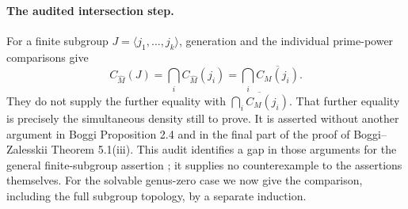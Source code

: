 \paragraph{The audited intersection step.}
For a finite subgroup $J=\langle j_1,\ldots,j_k\rangle$,
generation and the individual prime-power comparisons give
\[
 C_{\widehat M}(J)
   =\bigcap_i C_{\widehat M}(j_i)
   =\bigcap_i\overline{C_M(j_i)}.
                                                               \tag{A.T2}
\]
They do not supply the further equality with
$\overline{\bigcap_i C_M(j_i)}$.  That further equality is precisely
the simultaneous density still to prove.  It is asserted without
another argument in Boggi Proposition 2.4 and in the final part of
the proof of Boggi--Zalesskii Theorem 5.1(iii).  This audit identifies
a gap in those arguments for the general finite-subgroup assertion
\cite[Proposition 2.4]{CA_Boggi2026};
it supplies no counterexample to the assertions themselves.  For
the solvable genus-zero case we now give the comparison, including
the full subgroup topology, by a separate induction.

